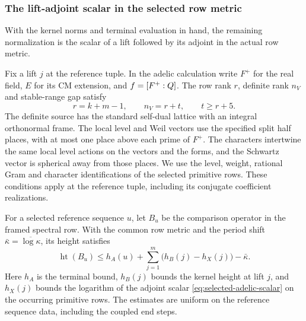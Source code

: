 \subsubsection{The lift-adjoint scalar in the selected row metric}
\label{subsec:selected-lift-scalar}

With the kernel norms and terminal evaluation in hand, the remaining normalization is the scalar of a lift followed by its adjoint in the actual row metric.

Fix a lift \(j\) at the reference tuple. In the adelic
calculation write \(F^+\) for the real field, \(E\) for
its CM extension, and \(f=[F^+:Q]\). The row rank \(r\), definite rank \(n_V\) and stable-range gap satisfy
\[
             r=k+m-1,\qquad n_V=r+t,\qquad t\ge r+5 .
\] The definite source has the
standard self-dual lattice with an integral orthonormal
frame. The local level and Weil vectors use the specified
split half places, with at most one place above each prime
of \(F^+\). The characters intertwine the same local
level actions on the vectors and the forms, and the
Schwartz vector is spherical away from those places.
We use the level, weight, rational Gram and character
identifications of the selected primitive rows. These
conditions apply at the reference tuple, including its
conjugate coefficient realizations.
\label{cor:selected-lift-scalar-1}

\begin{proposition}\label{prop:selected-reference-height}
For a selected reference sequence \(u\), let \(B_u\) be
the comparison operator in the framed spectral row. With
the common row metric and the period shift
\(\bar\kappa=\overline{\log\kappa}\), its height satisfies
\[
 \operatorname{ht}(B_u)\le h_A(u)+
       \sum_{j=1}^m\bigl(h_B(j)-h_X(j)\bigr)-\bar\kappa .
\]
Here \(h_A\) is the terminal bound, \(h_B(j)\) bounds the
kernel height at lift \(j\), and \(h_X(j)\) bounds the
logarithm of the adjoint scalar \eqref{eq:selected-adelic-scalar}
on the occurring primitive rows. The estimates are uniform on the reference
sequence data, including the coupled end steps.
\end{proposition}

